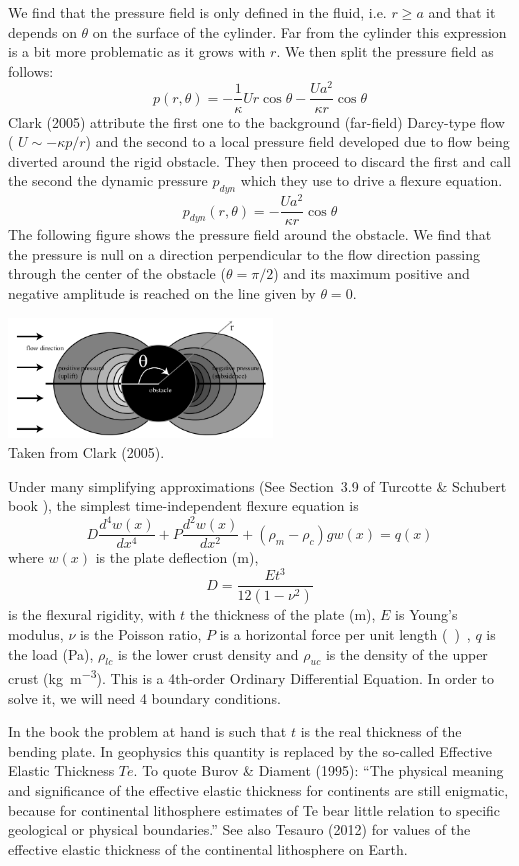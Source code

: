 We find that the pressure field is only defined in the fluid, i.e. $r\geq a$ and that it depends on $\theta$ on the surface of the cylinder. Far from the cylinder this expression is a bit more problematic as it grows with $r$. We then split the pressure field as follows:
\[
p(r,\theta) = 
-\frac{1}{\kappa} U r  \cos \theta
 -\frac{U a^2 }{\kappa r}  \cos \theta
\]
Clark \etal (2005) attribute the first one to the background (far-field) Darcy-type flow ( $U \sim - \kappa p/r$) and the second to a local pressure field developed
due to flow being diverted around the rigid obstacle. They 
then proceed to discard the first and call the second the dynamic pressure $p_{dyn}$ which they use to drive a flexure equation. 
\[
p_{dyn}(r,\theta) = -\frac{U a^2 }{\kappa r}  \cos \theta
\]
The following figure shows the pressure field around the obstacle.
We find that the pressure is null on a direction perpendicular to the flow direction passing through the center of the obstacle ($\theta=\pi/2$) and its maximum positive and negative amplitude is reached on the line given by $\theta=0$.
\begin{center}
\includegraphics[width=7cm]{python_codes/fieldstone_108/images/clbr05b}\\
{\captionfont 
Taken from Clark \etal (2005). }
\end{center}

Under many simplifying approximations (See Section~3.9 of Turcotte \& Schubert book \cite{tusc}), 
the simplest time-independent flexure equation is
\[
D \frac{d^4w(x)}{dx^4} + P \frac{d^2w(x)}{dx^2} + (\rho_m-\rho_c)g w(x) = q(x)
\]
where $w(x)$ is the plate deflection (\si{m}), 
\[
D=\frac{E t^3}{12(1-\nu^2)}
\]
is the flexural rigidity, with $t$ the thickness of the plate (\si{m}), 
$E$ is Young's modulus, $\nu$ is the Poisson ratio, 
$P$ is a horizontal force per unit length (\si{\kg\per\square\metre\square\sec}),  
$q$ is the load (\si{\pascal}), 
$\rho_{lc}$ is the lower crust density and $\rho_{uc}$ is the density of the upper crust (\si{\kg\per\cubic\metre}).
This is a 4th-order Ordinary Differential Equation. 
In order to solve it, we will need 4 boundary conditions.

In the book the problem at hand is such that $t$ is the real thickness of the bending plate. 
In geophysics this quantity is replaced by the so-called Effective Elastic Thickness $T\!e$.
To quote Burov \& Diament (1995): ``The physical meaning and significance of the effective elastic thickness
for continents are still enigmatic, because for continental lithosphere estimates of Te bear little 
relation to specific geological or physical boundaries.'' 
See also Tesauro \etal (2012) \cite{teak12} for values of the effective elastic thickness of the continental lithosphere
on Earth.

